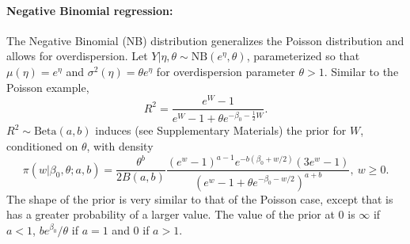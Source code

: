 \documentclass[12pt]{article}
\begin{document}
\paragraph{Negative Binomial regression:} The Negative Binomial (NB) distribution generalizes the Poisson distribution and allows for overdispersion. Let $Y|\eta,\theta\sim\mbox{NB}(e^\eta,\theta)$, parameterized so that $\mu(\eta) = e^{\eta}$ and $\sigma^2(\eta) = \theta e^{\eta}$ for overdispersion parameter $\theta>1$.
Similar to the Poisson example, %
\begin{equation}
    R^2
    =\frac{e^{W}-1}{e^{W}-1+\theta e^{-\beta_0-\frac12W}}.
\end{equation}
$R^2\sim\mbox{Beta}(a,b)$ induces (see Supplementary Materials) the prior for $W$, conditioned on $\theta$, with density
\begin{equation}\label{eq:OD}
    \pi(w|\beta_0, \theta; a,b)
    =\frac{\theta^b}{2B(a,b)} \frac{(e^w-1)^{a-1}e^{-b(\beta_0+w/2)}(3e^w-1)}{(e^w-1+\theta e^{-\beta_0-w/2})^{a+b}},\ w\geq 0.
\end{equation}
The shape of the prior is very similar to that of the Poisson case, except that is has a greater probability of a larger value. The value of the prior at 0 is $\infty$ if $a<1$, $be^{\beta_0}/\theta$ if $a=1$ and $0$ if $a>1$.
\end{document}
